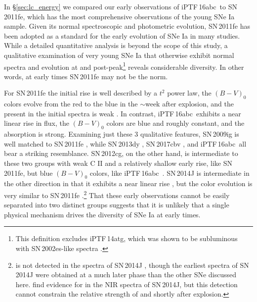 \documentclass[twocolumn]{aastex61}
\newcommand{\abc}{iPTF\,16abc}
\begin{document}
In \S\ref{sec:lc_energy} we compared our early observations of \abc\ to SN\,2011fe, which has the most comprehensive observations of the young SNe Ia sample. Given its normal spectroscopic and photometric evolution, SN\,2011fe has been adopted as a standard for the early evolution of SNe Ia in many studies. While a detailed quantitative analysis is beyond the scope of this study, a qualitative examination of very young SNe Ia that otherwise exhibit normal spectra and evolution at and post-peak\footnote{This definition excludes iPTF\,14atg, which was shown to be subluminous with SN\,2002es-like spectra \citep{2015Natur.521..328C}.} reveals considerable diversity. In other words, at early times SN\,2011fe may not be the norm.

For SN\,2011fe the initial rise is well described by a $t^2$ power law, the $(B - V)_0$ colors evolve from the red to the blue in the $\sim$week after explosion, and the  present in the initial spectra is weak \citep{2011Natur.480..344N,2016ApJ...820...67Z,2012ApJ...752L..26P}. In contrast, \abc\ exhibits a near linear rise in flux, the $(B - V)_0$ colors are blue and roughly constant, and the  absorption is strong. Examining just these 3 qualitative features, SN\,2009ig is well matched to SN\,2011fe \citep{2012ApJ...744...38F}, while SN\,2013dy \citep{2013ApJ...778L..15Z}, SN\,2017cbv \citep{2017arXiv170608990H}, and \abc\ all bear a striking resemblance. SN\,2012cg, on the other hand, is intermediate to these two groups with weak C II and a relatively shallow early rise, like SN\,2011fe, but blue $(B - V)_0$ colors, like \abc\ \citep{2012ApJ...756L...7S,2016ApJ...820...92M}. SN\,2014J is intermediate in the other direction in that it exhibits a near linear rise \citep{2014ApJ...783L..24Z,2015ApJ...799..106G}, but the color evolution is very similar to SN\,2011fe \citep{2014ApJ...788L..21A}.\footnote{ is not detected in the spectra of SN\,2014J \citep{2014ApJ...784L..12G,2014ApJ...783L..24Z}, though the earliest spectra of SN\,2014J were obtained at a much later phase than the other SNe discussed here. \citet{2015ApJ...798...39M} find evidence for  in the NIR spectra of SN\,2014J, but this detection cannot constrain the relative strength of  and  shortly after explosion.} That these early observations cannot be easily separated into two distinct groups suggests that it is unlikely that a single physical mechanism drives the diversity of SNe Ia at early times. 
\end{document}
